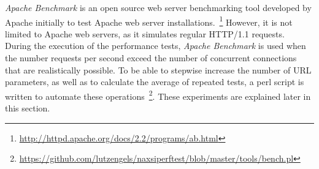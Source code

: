 \emph{Apache Benchmark} is an open source web server benchmarking tool developed by Apache initially to test Apache web server installations.~\footnote{\url{http://httpd.apache.org/docs/2.2/programs/ab.html}} However, it is not limited to Apache web servers, as it simulates regular HTTP/1.1 requests.\\
During the execution of the performance tests, \emph{Apache Benchmark} is used when the number requests per second exceed the number of concurrent connections that are realistically possible. To be able to stepwise increase the number of URL parameters, as well as to calculate the average of repeated tests, a perl script is written to automate these operations~\footnote{\url{https://github.com/lutzengels/naxsiperftest/blob/master/tools/bench.pl}}.  These experiments are explained later in this section.
